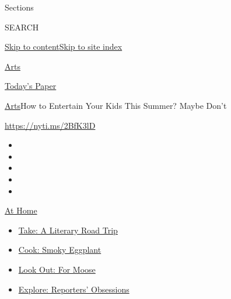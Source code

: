 Sections

SEARCH

\protect\hyperlink{site-content}{Skip to
content}\protect\hyperlink{site-index}{Skip to site index}

\href{https://www.nytimes3xbfgragh.onion/section/arts}{Arts}

\href{https://myaccount.nytimes3xbfgragh.onion/auth/login?response_type=cookie\&client_id=vi}{}

\href{https://www.nytimes3xbfgragh.onion/section/todayspaper}{Today's
Paper}

\href{/section/arts}{Arts}\textbar{}How to Entertain Your Kids This
Summer? Maybe Don't

\url{https://nyti.ms/2BfK3lD}

\begin{itemize}
\item
\item
\item
\item
\item
\end{itemize}

\href{https://www.nytimes3xbfgragh.onion/spotlight/at-home?action=click\&pgtype=Article\&state=default\&region=TOP_BANNER\&context=at_home_menu}{At
Home}

\begin{itemize}
\tightlist
\item
  \href{https://www.nytimes3xbfgragh.onion/2020/07/28/books/time-for-a-literary-road-trip.html?action=click\&pgtype=Article\&state=default\&region=TOP_BANNER\&context=at_home_menu}{Take:
  A Literary Road Trip}
\item
  \href{https://www.nytimes3xbfgragh.onion/2020/07/29/magazine/bored-with-your-home-cooking-some-smoky-eggplant-will-fix-that.html?action=click\&pgtype=Article\&state=default\&region=TOP_BANNER\&context=at_home_menu}{Cook:
  Smoky Eggplant}
\item
  \href{https://www.nytimes3xbfgragh.onion/2020/07/27/travel/moose-michigan-isle-royale.html?action=click\&pgtype=Article\&state=default\&region=TOP_BANNER\&context=at_home_menu}{Look
  Out: For Moose}
\item
  \href{https://www.nytimes3xbfgragh.onion/interactive/2020/at-home/even-more-reporters-editors-diaries-lists-recommendations.html?action=click\&pgtype=Article\&state=default\&region=TOP_BANNER\&context=at_home_menu}{Explore:
  Reporters' Obsessions}
\end{itemize}

